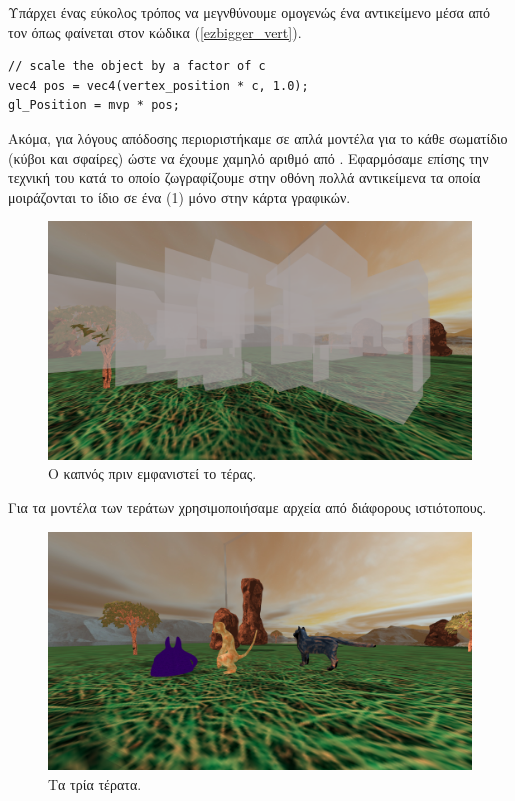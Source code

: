 \documentclass[11pt]{scrartcl} %
\newenvironment{centerimg}[1]%
{%
    \begin{figure}[H]
        #1
    \begin{center}
}%
{%
    \end{center}
    \end{figure}
}
\begin{document}
Υπάρχει ένας εύκολος τρόπος να μεγνθύνουμε ομογενώς ένα αντικείμενο μέσα από τον  όπως φαίνεται 
στον κώδικα (\ref{ezbigger_vert}).

\begin{minipage}{\textwidth}
\begin{lstlisting}[caption=\textgreek{Μεγέθυνση αντικειμένου από τον} vertex shader, label=ezbigger_vert]
// scale the object by a factor of c
vec4 pos = vec4(vertex_position * c, 1.0);
gl_Position = mvp * pos;
\end{lstlisting}
\end{minipage}

Ακόμα, για λόγους απόδοσης περιοριστήκαμε σε απλά μοντέλα για το κάθε σωματίδιο (κύβοι και σφαίρες) 
ώστε να έχουμε χαμηλό αριθμό από . Εφαρμόσαμε επίσης την τεχνική του 
κατά το οποίο ζωγραφίζουμε στην οθόνη πολλά αντικείμενα τα οποία μοιράζονται το ίδιο 
σε ένα (1) μόνο   στην κάρτα γραφικών.

\begin{centerimg}{\caption{Ο καπνός πριν εμφανιστεί το τέρας.}}
    \includegraphics[width=.7\textwidth]{./assets/smoke.png}
\end{centerimg}

 
Για τα μοντέλα των τεράτων χρησιμοποιήσαμε αρχεία  από διάφορους ιστιότοπους. 


\begin{centerimg}{\caption{Τα τρία τέρατα.}}
    \includegraphics[width=.7\textwidth]{./assets/monsters.png}
\end{centerimg}
\end{document}
